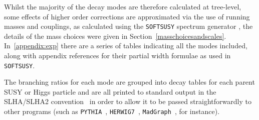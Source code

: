\documentclass[final,3p,times]{elsarticle}
\def\code#1{{\tt #1}}
\begin{document}
Whilst the majority of the decay modes are therefore calculated at tree-level,
some effects of higher order corrections are approximated via the use of
running masses and couplings, as calculated using the {\tt SOFTSUSY} spectrum
generator \cite{Allanach:2001kg}, the details of the mass choices were given
in Section~\ref{masschoicesandscales}. In~\ref{appendix:exp} there are a
series of tables indicating all the modes included, along with appendix references for
their partial width formulae as used in {\tt SOFTSUSY}.  

The branching ratios for each mode are grouped into decay tables for each
parent SUSY or Higgs particle and are all printed to standard
output in the SLHA/SLHA2 convention~\cite{Skands:2003cj,Allanach:2008qq} in
order to allow it to be passed straightforwardly to other programs
(such as {\tt PYTHIA}~\cite{Sjostrand:2014zea},
\code{HERWIG7}~\cite{Bahr:2008pv}, {\tt MadGraph}~\cite{Alwall:2014}, for
instance).  
\end{document}
